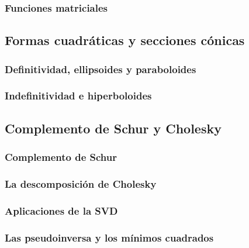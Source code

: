 \subsubsection{Funciones matriciales} %
\label{ssub:funciones_matriciales}

\subsection{Formas cuadráticas y secciones cónicas} %
\label{sub:formas_cuadraticas_y_secciones_conicas}

\subsubsection{Definitividad, ellipsoides y paraboloides} %
\label{ssub:definitividad_ellipsoides_y_paraboloides}

\subsubsection{Indefinitividad e hiperboloides} %
\label{ssub:indefinitividad_e_hiperboloides}

\subsection{Complemento de Schur y Cholesky} %
\label{sub:complemento_de_schur_y_cholesky}

\subsubsection{Complemento de Schur} %
\label{ssub:complemento_de_schur}

\subsubsection{La descomposición de Cholesky} %
\label{ssub:la_descomposicion_de_cholesky}

\subsubsection{Aplicaciones de la SVD} %
\label{ssub:aplicaciones_de_la_svd}

\subsubsection{Las pseudoinversa y los mínimos cuadrados} %
\label{ssub:las_pseudoinversa_y_los_minimos_cuadrados}

